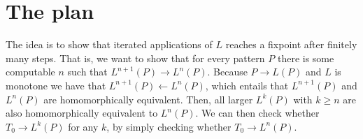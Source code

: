 \documentclass[a4paper]{article}
\begin{document}
\section{The plan}

The idea is to show that iterated applications of $L$ reaches a fixpoint
after finitely many steps. That is, we want to show that for every
pattern $P$ there is some computable $n$ such that $L^{n + 1}(P) \to
L^n(P)$. Because $P \to L(P)$ and $L$ is monotone we have that $L^{n +
1}(P) \leftarrow L^n(P)$, which entails that $L^{n + 1} (P)$ and
$L^n(P)$ are homomorphically equivalent. Then, all larger $L^k(P)$ with
$k \geq n$ are also homomorphically equivalent to $L^n(P)$. We can then
check whether $T_0 \to L^k(P)$ for any $k$, by simply checking whether
$T_0 \to L^n(P)$.
\end{document}
